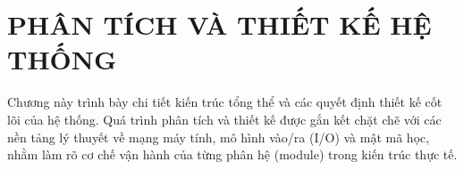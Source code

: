 \chapter{PHÂN TÍCH VÀ THIẾT KẾ HỆ THỐNG}

Chương này trình bày chi tiết kiến trúc tổng thể và các quyết định thiết kế cốt lõi của hệ thống. Quá trình phân tích và thiết kế được gắn kết chặt chẽ với các nền tảng lý thuyết về mạng máy tính, mô hình vào/ra (I/O) và mật mã học, nhằm làm rõ cơ chế vận hành của từng phân hệ (module) trong kiến trúc thực tế.







